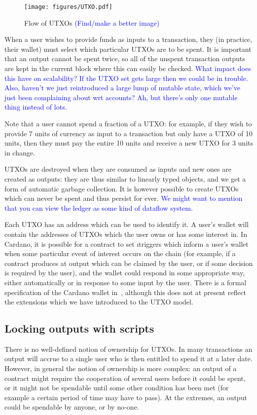 \documentclass[a4paper]{article}
\newcommand{\blue}[1]{\textcolor{blue}{#1}}
\theoremstyle{definition}  %
\begin{document}
\begin{figure}[H]
\begin{center}
\texttt{[image: figures/UTXO.pdf]}
\end{center}
\caption{Flow of UTXOs \blue{(Find/make a better image)}}
\label{fig:utxo}
\end{figure}


When a user wishes to provide funds as inputs to a transaction, they
(in practice, their wallet) must select which particular UTXOs are to
be spent.  It is important that an output cannot be spent twice, so
all of the unspent transaction outputs are kept in the current block
where this can easily be checked.  \blue{What impact does this have on
  scalability?  If the UTXO set gets large then we could be in
  trouble.  Also, haven't we just reintroduced a large lump of mutable
  state, which we've just been complaining about wrt accounts? Ah, but
  there's only one mutable thing instead of lots.}

Note that a user cannot spend a fraction of a UTXO: for example, if
they wish to provide 7 units of currency as input to a transaction but
only have a UTXO of 10 units, then they must pay the entire 10 units
and receive a new UTXO for 3 units in change.

UTXOs are destroyed when they are consumed as inputs and new ones are
created as outputs: they are thus similar to linearly typed objects,
and we get a form of automatic garbage collection.  It is however
possible to create UTXOs which can never be spent and thus persist
for ever.  \blue{We might want to mention that you can view the ledger
  as some kind of dataflow system.}

Each UTXO has an address which can be used to identify it. A user's
wallet will contain the addresses of UTXOs which the user owns or has
some interest in.  In Cardano, it is possible for a contract to set
\i{triggers} which inform a user's wallet when some particular event
of interest occurs on the chain (for example, if a contract produces
at output which can be claimed by the user, or if some decision is
required by the user), and the wallet could respond in some
appropriate way, either automatically or in response to some input by
the user.  There is a formal specification of the Cardano wallet
in~\cite{Cardano-wallet-spec}, although this does not at present
reflect the extensions which we have introduced to the UTXO model.

\subsection{Locking outputs with scripts}
\label{sec:scripts}
There is no well-defined notion of ownership for UTXOs.  In many
transactions an output will accrue to a single user who is then
entitled to spend it at a later date.  However, in general the notion
of ownership is more complex: an output of a contract might require
the cooperation of several users before it could be spent, or it might
not be spendable until some other condition has been met (for example
a certain period of time may have to pass).  At the extremes, an
output could be spendable by anyone, or by no-one.
\end{document}
